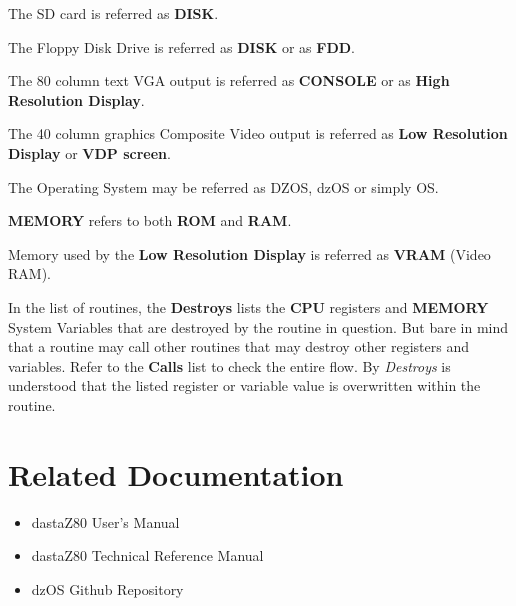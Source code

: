 \documentclass[a4paper,11pt]{article}
\begin{document}
    The SD card is referred as \textbf{DISK}.
    
    The Floppy Disk Drive is referred as \textbf{DISK} or as \textbf{FDD}.

    The 80 column text VGA output is referred as \textbf{CONSOLE} or as
    \textbf{High Resolution Display}.

    The 40 column graphics Composite Video output is referred as \textbf{Low
    Resolution Display} or \textbf{VDP screen}.

    The Operating System may be referred as DZOS, dzOS or simply OS.

    \textbf{MEMORY} refers to both \textbf{ROM} and \textbf{RAM}.

    Memory used by the \textbf{Low Resolution Display} is referred as
    \textbf{VRAM} (Video RAM).

    In the list of routines, the \textbf{Destroys} lists the \textbf{CPU}
    registers and \textbf{MEMORY} System Variables that are destroyed by the
    routine in question. But bare in mind that a routine may call other routines
    that may destroy other registers and variables. Refer to the \textbf{Calls}
    list to check the entire flow. By \textit{Destroys} is understood that the
    listed register or variable value is overwritten within the routine.

    \pagebreak
    \section*{Related Documentation}
    \begin{itemize}
        \item dastaZ80 User's Manual\cite{dastaz80userman}
        \item dastaZ80 Technical Reference Manual\cite{dastaz80techman}
        \item dzOS Github Repository\cite{dastaZ80github}
    \end{itemize}

    \pagebreak
    \tableofcontents

    \pagebreak
    \pagestyle{fancy}
    \fancyhf{}
    \fancyfoot[R]{\thepage}
    \setcounter{page}{1}
\end{document}
